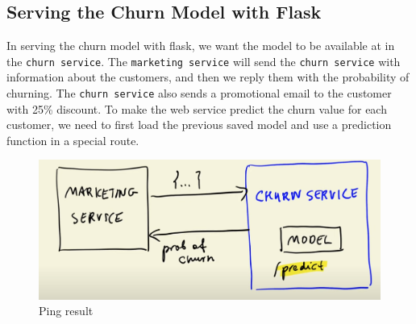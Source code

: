 \documentclass[letterpaper,12pt,notitlepage,twoside]{report}
\begin{document}
\subsection{Serving the Churn Model with Flask}
In serving the churn model with flask, we want the model to be available at  in the \texttt{churn service}. The \texttt{marketing service} will send the \texttt{churn service} with information about the customers, and then we reply them with the probability of churning. The \texttt{churn service} also sends a promotional email to the customer with 25\% discount. To make the web service predict the churn value for each customer, we need to first load the previous saved model and use a prediction function in a special route.
\begin{figure}[h]
	\centering
	\includegraphics[width=\textwidth]{Images/deploy-flask.png}
	\caption{Ping result}
	\label{fig:10}
\end{figure}
\FloatBarrier
\end{document}
